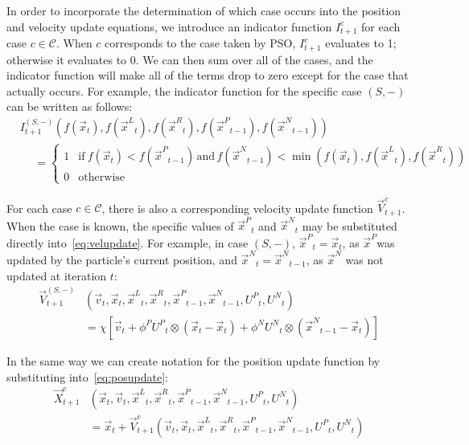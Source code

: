 \documentclass{llncs}
\newcommand{\parens}[1]{\!\left(#1\right)}
\providecommand{\pers}{\ensuremath{P}}
\providecommand{\neigh}{\ensuremath{N}}
\providecommand{\leftind}{\ensuremath{L}}
\providecommand{\rightind}{\ensuremath{R}}
\providecommand{\nURand}{\ensuremath{U^\neigh}}
\providecommand{\pURand}{\ensuremath{U^\pers}}
\providecommand{\ppos}{\ensuremath{\Vec{x}}}
\providecommand{\pvel}{\ensuremath{\Vec{v}}}
\providecommand{\nbest}{\ensuremath{\Vec{x}^\neigh}}
\providecommand{\pbest}{\ensuremath{\Vec{x}^\pers}}
\providecommand{\constriction}{\ensuremath{\chi}}
\providecommand{\ncoeff}{\ensuremath{\phi^\neigh}}
\providecommand{\pcoeff}{\ensuremath{\phi^\pers}}
\providecommand{\ofunc}{\ensuremath{f}}
\providecommand{\indic}{\ensuremath{I}}
\providecommand{\specvel}{\ensuremath{\vec{V}}}
\providecommand{\specpos}{\ensuremath{\vec{X}}}
\providecommand{\leftn}{\ensuremath{\Vec{x}^\leftind}}
\providecommand{\rightn}{\ensuremath{\Vec{x}^\rightind}}
\providecommand{\caseset}{\ensuremath{\mathcal{C}}}
\providecommand{\casegen}{\ensuremath{c}}
\providecommand{\casexn}{\ensuremath{(S,-)}}
\begin{document}
In order to incorporate the determination of which case occurs into the
position and velocity update equations, we introduce an indicator function
$\indic_{t+1}^{\casegen}$ for each case $\casegen \in \caseset$.  When
$\casegen$ corresponds to the case taken by PSO,
$\indic_{t+1}^{\casegen}$ evaluates to 1; otherwise it evaluates to 0.  We can
then sum over all of the cases, and the indicator function will make all of the
terms drop to zero except for the case that actually occurs.  For example, the
indicator function for the specific case $\casexn$ can be written as follows:
\begin{align}
  \nonumber
	&\indic_{t+1}^{\casexn}\parens{
	  \ofunc\parens{\ppos_{t}},
	  \ofunc\parens{\leftn_{t}},
	  \ofunc\parens{\rightn_{t}},
	  \ofunc\parens{\pbest_{t-1}},
	  \ofunc\parens{\nbest_{t-1}}
	  } \\
  &\hspace{15pt}= \label{eq:deficasexn}
	\begin{cases}
	  1 & \text{if}~
		\ofunc\parens{\ppos_{t}} < \ofunc\parens{\pbest_{t-1}}
	    \,\text{and}\,
		\ofunc\parens{\nbest_{t-1}} < \min\parens{
		  \ofunc\parens{\ppos_{t}},
		  \ofunc\parens{\leftn_{t}},
		  \ofunc\parens{\rightn_{t}}
		} \\
	   0 & \text{otherwise}
	\end{cases}
\end{align}

For each case $\casegen \in \caseset$, there is also a corresponding
velocity update function $\specvel_{t+1}^{\casegen}$.  When the case is
known, the specific values of $\pbest_t$ and $\nbest_t$ may be substituted
directly into~\eqref{eq:velupdate}.  For example, in case $\casexn$,
$\pbest_{t}=\ppos_{t}$, as \pbest was updated by the particle's current
position, and $\nbest_{t}=\nbest_{t-1}$, as $\nbest$ was not updated at
iteration $t$:
\begin{align}
\nonumber
	\specvel_{t+1}^{\casexn} & \parens{\pvel_t, \ppos_{t}, \leftn_{t}, \rightn_{t},
	\pbest_{t-1}, \nbest_{t-1}, \pURand_{t}, \nURand_{t}} \\
\label{eq:defvcasexn}
		&= \constriction \left[ \pvel_{t} +
			\pcoeff\pURand_{t}\otimes\parens{\ppos_{t} - \ppos_{t}}
			+ \ncoeff\nURand_{t}\otimes\parens{\nbest_{t-1} -
			\ppos_{t}} \right]
\end{align}

In the same way we can create notation for the position update function by
substituting into~\eqref{eq:posupdate}:
\begin{align}
    \nonumber
	\specpos_{t+1}^{\casegen} & \parens{\ppos_{t}, \pvel_{t}, \leftn_{t},
	\rightn_{t} ,\pbest_{t-1} ,\nbest_{t-1}, \pURand_{t}, \nURand_{t}}
        \\
    \label{eq:defpcasegen}
        &=
	\ppos_{t} + \specvel_{t+1}^{\casegen}
	\parens{\pvel_t, \ppos_{t}, \leftn_{t}, \rightn_{t},
	\pbest_{t-1}, \nbest_{t-1}, \pURand_{t}, \nURand_{t}}
\end{align}
\end{document}
